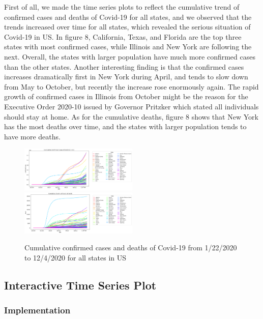 \documentclass{article}
\begin{document}
First of all, we made the time series plots to reflect the cumulative trend of confirmed cases and deaths of Covid-19 for all states, and we observed that the trends increased over time for all states, which revealed the serious situation of Covid-19 in US. In figure 8, California, Texas, and Florida are the top three states with most confirmed cases, while Illinois and New York are following the next. Overall, the states with larger population have much more confirmed cases than the other states. Another interesting finding is that the confirmed cases increases dramatically first in New York during April, and tends to slow down from May to October, but recently the increase rose enormously again. The rapid growth of confirmed cases in Illinois from October might be the reason for the Executive Order 2020-10 issued by Governor Pritzker which stated all individuals should stay at home. As for the cumulative deaths, figure 8 shows that New York has the most deaths over time, and the states with larger population tends to have more deaths. 





\begin{figure}[htp]
\centering
\includegraphics[width=0.5\textwidth]{cum_confirmed2.png}\hfill
\includegraphics[width=0.5\textwidth]{cum_death2.png}
\caption{Cumulative confirmed cases and deaths of Covid-19 from 1/22/2020 to 12/4/2020 for all states in US}
\label{fig:figure}

\end{figure}
\FloatBarrier




\subsection{Interactive Time Series Plot}

\subsubsection{Implementation}
\end{document}

